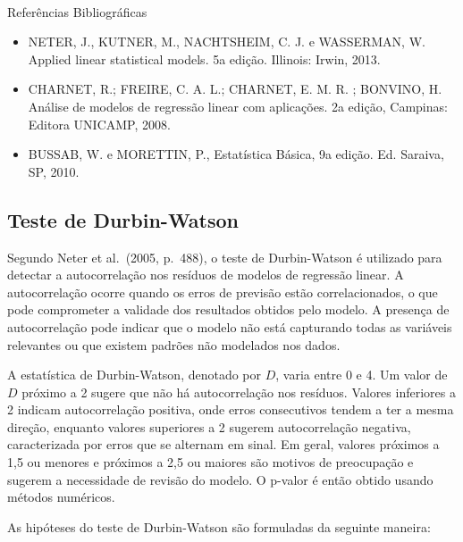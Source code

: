\documentclass[
  portuguese,
]{estat/estat}
\makeatletter
\let\oldparagraph\paragraph
\renewcommand{\paragraph}{
    \@ifstar
      \xxxParagraphStar
      \xxxParagraphNoStar
  }
\newcommand{\xxxParagraphStar}[1]{\oldparagraph*{#1}\mbox{}}
\newcommand{\xxxParagraphNoStar}[1]{\oldparagraph{#1}\mbox{}}
\providecommand{\tightlist}{%
  \setlength{\itemsep}{0pt}\setlength{\parskip}{0pt}}
\makeatother
\begin{document}
\paragraph{Referências
Bibliográficas}\label{referuxeancias-bibliogruxe1ficas}

\begin{itemize}
\tightlist
\item
  NETER, J., KUTNER, M., NACHTSHEIM, C. J. e WASSERMAN, W. Applied
  linear statistical models. 5a edição. Illinois: Irwin, 2013.
\item
  CHARNET, R.; FREIRE, C. A. L.; CHARNET, E. M. R. ; BONVINO, H. Análise
  de modelos de regressão linear com aplicações. 2a edição, Campinas:
  Editora UNICAMP, 2008.
\item
  BUSSAB, W. e MORETTIN, P., Estatística Básica, 9a edição. Ed. Saraiva,
  SP, 2010.
\end{itemize}

\subsection{Teste de Durbin-Watson}\label{teste-de-durbin-watson}

Segundo Neter et al.~(2005, p.~488), o teste de Durbin-Watson é
utilizado para detectar a autocorrelação nos resíduos de modelos de
regressão linear. A autocorrelação ocorre quando os erros de previsão
estão correlacionados, o que pode comprometer a validade dos resultados
obtidos pelo modelo. A presença de autocorrelação pode indicar que o
modelo não está capturando todas as variáveis relevantes ou que existem
padrões não modelados nos dados.

A estatística de Durbin-Watson, denotado por \(D\), varia entre 0 e 4.
Um valor de \(D\) próximo a 2 sugere que não há autocorrelação nos
resíduos. Valores inferiores a 2 indicam autocorrelação positiva, onde
erros consecutivos tendem a ter a mesma direção, enquanto valores
superiores a 2 sugerem autocorrelação negativa, caracterizada por erros
que se alternam em sinal. Em geral, valores próximos a 1,5 ou menores e
próximos a 2,5 ou maiores são motivos de preocupação e sugerem a
necessidade de revisão do modelo. O p-valor é então obtido usando
métodos numéricos.

As hipóteses do teste de Durbin-Watson são formuladas da seguinte
maneira:

\end{document}
